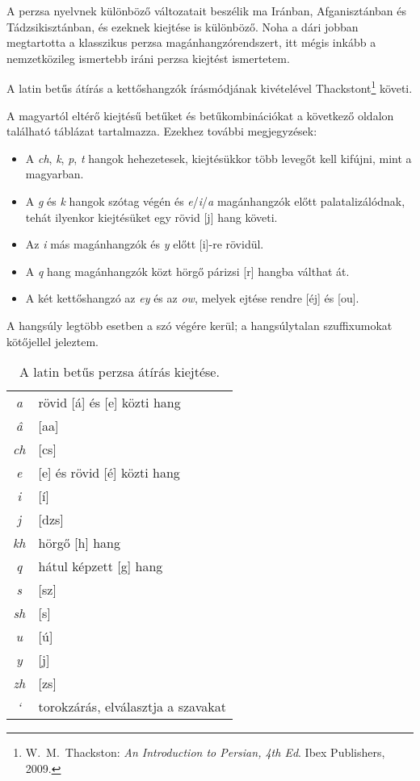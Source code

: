 A perzsa nyelvnek különböző változatait beszélik ma Iránban,
Afganisztánban és Tádzsikisztánban, és ezeknek kiejtése is
különböző. Noha a dári jobban megtartotta a klasszikus perzsa
magánhangzórendszert, itt mégis inkább a nemzetközileg ismertebb iráni
perzsa kiejtést ismertetem.

A latin betűs átírás a kettőshangzók írásmódjának kivételével
Thackstont\footnote{W.~M.~Thackston: \emph{An Introduction to Persian,
    4th Ed}. Ibex Publishers, 2009.} követi.

A magyartól eltérő kiejtésű betűket és betűkombinációkat a következő
oldalon található táblázat tartalmazza. Ezekhez további megjegyzések:

\begin{itemize}
  \item A \emph{ch}, \emph{k}, \emph{p}, \emph{t} hangok hehezetesek,
    kiejtésükkor több levegőt kell kifújni, mint a magyarban.
  \item A \emph{g} és \emph{k} hangok szótag végén és
    \emph{e}/\emph{i}/\emph{a} magánhangzók előtt palatalizálódnak,
    tehát ilyenkor kiejtésüket egy rövid [j] hang követi.
  \item Az \emph{i} más magánhangzók és \emph{y} előtt [i]-re rövidül.
  \item A \emph{q} hang magánhangzók közt hörgő párizsi [r] hangba
    válthat át.
  \item A két kettőshangzó az \emph{ey} és az \emph{ow}, melyek ejtése
    rendre [éj] és [ou].
\end{itemize}

A hangsúly legtöbb esetben a szó végére kerül; a hangsúlytalan
szuffixumokat kötőjellel jeleztem.

\begin{table}[h]
  \begin{center}
    \smallskip\smallskip
    \begin{tabular}{cl}
      \emph{a} & rövid [á] és [e] közti hang\\
      \emph{â} & [aa]\\
      \emph{ch} & [cs]\\
      \emph{e} & [e] és rövid [é] közti hang\\
      \emph{i} & [í]\\
      \emph{j} & [dzs]\\
      \emph{kh} & hörgő [h] hang\\
      \emph{q} & hátul képzett [g] hang\\
      \emph{s} & [sz]\\
      \emph{sh} & [s]\\
      \emph{u} & [ú]\\
      \emph{y} & [j]\\
      \emph{zh} & [zs]\\
      \emph{`} & torokzárás, elválasztja a szavakat\\
    \end{tabular}
  \end{center}
  \caption{A latin betűs perzsa átírás kiejtése.}
\end{table}
